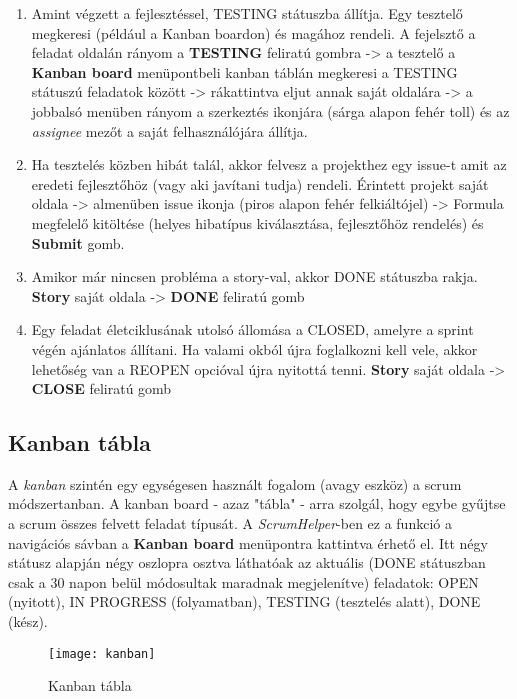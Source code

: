 \begin{enumerate}
	\item Amint végzett a fejlesztéssel, TESTING státuszba állítja. Egy tesztelő megkeresi (például a Kanban boardon) és magához rendeli. A fejelsztő a feladat oldalán rányom a \textbf{TESTING} feliratú gombra -> a tesztelő a \textbf{Kanban board} menüpontbeli kanban táblán megkeresi a TESTING státuszú feladatok között -> rákattintva eljut annak saját oldalára -> a jobbalsó menüben rányom a szerkeztés ikonjára (sárga alapon fehér toll) és az \textit{assignee} mezőt a saját felhasználójára állítja.
	\item Ha tesztelés közben hibát talál, akkor felvesz a projekthez egy issue-t amit az eredeti fejlesztőhöz (vagy aki javítani tudja) rendeli. Érintett projekt saját oldala -> almenüben issue ikonja (piros alapon fehér felkiáltójel) -> Formula megfelelő kitöltése (helyes hibatípus kiválasztása, fejlesztőhöz rendelés) és \textbf{Submit} gomb.
	\item Amikor már nincsen probléma a story-val, akkor DONE státuszba rakja. \textbf{Story} saját oldala -> \textbf{DONE} feliratú gomb
	\item Egy feladat életciklusának utolsó állomása a CLOSED, amelyre a sprint végén ajánlatos állítani. Ha valami okból újra foglalkozni kell vele, akkor lehetőség van a REOPEN opcióval újra nyitottá tenni. \textbf{Story} saját oldala -> \textbf{CLOSE} feliratú gomb
\end{enumerate}

\subsection{Kanban tábla}
\label{kanbanboard}

A \textit{kanban} szintén egy egységesen használt fogalom (avagy eszköz) a scrum módszertanban. A kanban board - azaz "tábla" - arra szolgál, hogy egybe gyűjtse a scrum összes felvett feladat típusát. A \textit{ScrumHelper}-ben ez a funkció a navigációs sávban a \textbf{Kanban board} menüpontra kattintva érhető el. Itt négy státusz alapján négy oszlopra osztva láthatóak az aktuális (DONE státuszban csak a 30 napon belül módosultak maradnak megjelenítve) feladatok: OPEN (nyitott), IN PROGRESS (folyamatban), TESTING (tesztelés alatt), DONE (kész).

\begin{figure}[H]
	\centering
	\texttt{[image: kanban]}
	\caption{Kanban tábla}
	\label{fig:kanban}
\end{figure}

